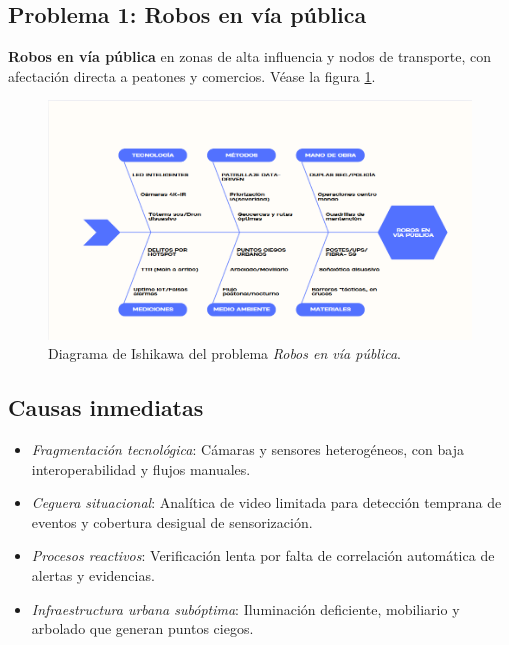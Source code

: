 \documentclass[12pt,a4paper]{article}
\begin{document}
\subsection*{Problema 1: Robos en vía pública}
\textbf{Robos en vía pública} en zonas de alta influencia y nodos de transporte, con afectación directa a peatones y comercios. Véase la figura \ref{fig:mapa-problemas-seguridad}.
\begin{figure}[htbp]
  \centering
  \includegraphics[width=\linewidth, keepaspectratio]{ishikawa_p1.png}
  \caption{Diagrama de Ishikawa del problema \textit{Robos en vía pública}.}
  \label{fig:mapa-problemas-seguridad}
\end{figure}

\subsection*{Causas inmediatas}
\begin{itemize}
    \item \textit{Fragmentación tecnológica}: Cámaras y sensores heterogéneos, con baja interoperabilidad y flujos manuales.
    \item \textit{Ceguera situacional}: Analítica de video limitada para detección temprana de eventos y cobertura desigual de sensorización.
    \item \textit{Procesos reactivos}: Verificación lenta por falta de correlación automática de alertas y evidencias.
    \item \textit{Infraestructura urbana subóptima}: Iluminación deficiente, mobiliario y arbolado que generan puntos ciegos.
\end{itemize}
\end{document}

